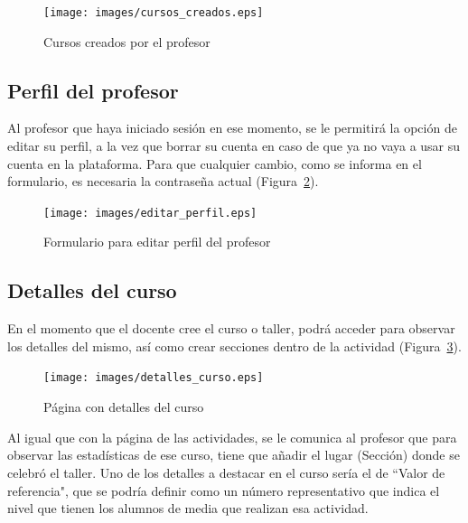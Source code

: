 \begin{figure}[!th]
\begin{center}
\texttt{[image: images/cursos\_creados.eps]}
\caption{Cursos creados por el profesor}
\label{fig:14}
\end{center}
\end{figure}


\subsection{Perfil del profesor}
\label{1:sec:4}

Al profesor que haya iniciado sesión en ese momento, se le permitirá la opción de editar su perfil, a la vez que borrar su cuenta en caso de que ya no vaya a usar su cuenta en la plataforma.
Para que cualquier cambio, como se informa en el formulario, es necesaria la contraseña actual (Figura~\ref{fig:15}).

\begin{figure}[!th]
\begin{center}
\texttt{[image: images/editar\_perfil.eps]}
\caption{Formulario para editar perfil del profesor}
\label{fig:15}
\end{center}
\end{figure}


\newpage
\subsection{Detalles del curso}
\label{1:sec:5}

En el momento que el docente cree el curso o taller, podrá acceder para observar los detalles del mismo, así como crear secciones dentro de la actividad (Figura~\ref{fig:16}).

\begin{figure}[!th]
\begin{center}
\texttt{[image: images/detalles\_curso.eps]}
\caption{Página con detalles del curso}
\label{fig:16}
\end{center}
\end{figure}

Al igual que con la página de las actividades, se le comunica al profesor que para observar las estadísticas de ese curso, tiene que añadir el lugar (Sección) donde se celebró el taller.
Uno de los detalles a destacar en el curso sería el de ``Valor de referencia", que se podría definir como un número representativo que indica el nivel que tienen los alumnos de media que realizan
esa actividad.

